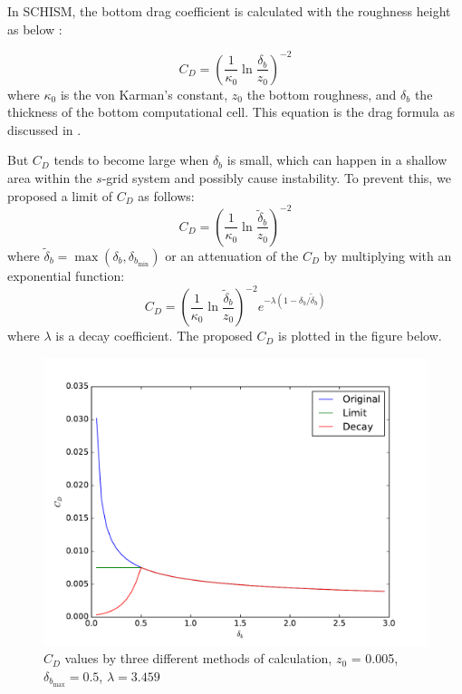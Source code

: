 \documentclass{article}
\begin{document}
In SCHISM, the bottom drag coefficient is calculated with the roughness height \citep{Zhang08} as below :

\begin{equation}
C_D = \left( \frac{1}{\kappa_0} \ln \frac{\delta_b}{z_0}\right) ^ {-2}
\end{equation}
where $\kappa_0$ is the von Karman's constant, $z_0$  the bottom roughness, and $\delta_b$ the thickness of the bottom computational cell.
This equation is the drag formula as discussed in \citet{Blumberg87p1}.

But $C_D$ tends to become large when $\delta_b$ is small, which can happen in a shallow area within the $s$-grid system and possibly cause instability. To prevent this, we proposed a limit of $C_D$ as follows:
\begin{equation}
C_D = \left( \frac{1}{\kappa_0} \ln \frac{\tilde \delta_b}{z_0}\right) ^ {-2}
\end{equation}
where $\tilde \delta_b = \max (\delta_b, \delta_{b_{\min}})$ or an attenuation of the $C_D$ by multiplying with an exponential function:
\begin{equation}
C_D = \left( \frac{1}{\kappa_0} \ln \frac{\tilde \delta_b}{z_0}\right) ^ {-2} e ^ {-\lambda ( 1- \delta_b / \tilde \delta_b) }
\end{equation}
where $\lambda$ is a decay coefficient. The proposed $C_D$ is plotted in the figure below.

\begin{figure}
\centering
\includegraphics[width=\textwidth]{image/cd}
\caption{$C_D$ values by three different methods of calculation, $z_0$ = 0.005, $\delta_{b_{\max}}=0.5$, $\lambda=3.459$}
\end{figure}

%
 
\end{document}
